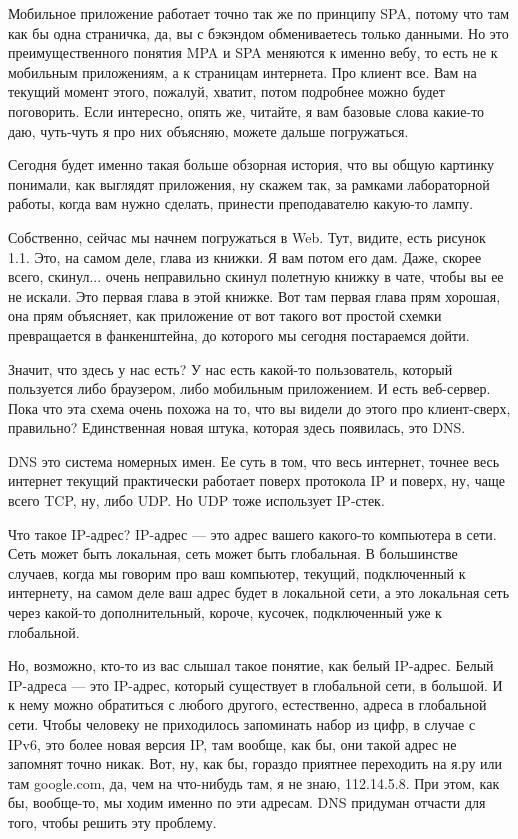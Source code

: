 \documentclass[12pt]{article} %
\begin{document}
Мобильное приложение работает точно так же по принципу SPA, потому что там как бы одна страничка, да, вы с бэкэндом обмениваетесь только данными.  Но это преимущественного понятия MPA и SPA меняются к именно вебу, то есть не к мобильным приложениям, а к страницам интернета.  Про клиент все.  Вам на текущий момент этого, пожалуй, хватит, потом подробнее можно будет поговорить.  Если интересно, опять же, читайте, я вам базовые слова какие-то даю, чуть-чуть я про них объясняю, можете дальше погружаться.


Сегодня будет именно такая больше обзорная история, что вы общую картинку понимали, как выглядят приложения, ну скажем так, за рамками лабораторной работы, когда вам нужно сделать, принести преподавателю какую-то лампу. 

Собственно, сейчас мы начнем погружаться в Web. Тут, видите, есть рисунок 1.1.  Это, на самом деле, глава из книжки. Я вам потом его дам. Даже, скорее всего, скинул...  очень неправильно скинул полетную книжку в чате, чтобы вы ее не искали.  Это первая глава в этой книжке.  Вот там первая глава прям хорошая, она прям объясняет, как приложение от вот такого вот простой схемки превращается в фанкенштейна, до которого мы сегодня постараемся дойти.  

Значит, что здесь у нас есть?  У нас есть какой-то пользователь, который пользуется либо браузером, либо мобильным приложением.  И есть веб-сервер.  Пока что эта схема очень похожа на то, что вы видели до этого про клиент-сверх, правильно?  Единственная новая штука, которая здесь появилась, это DNS.  

DNS это система номерных имен.  Ее суть в том, что весь интернет, точнее весь интернет текущий практически работает поверх протокола IP и поверх, ну, чаще всего TCP, ну, либо UDP.  Но UDP тоже использует IP-стек.  

Что такое IP-адрес?  IP-адрес — это адрес вашего какого-то компьютера в сети.  Сеть может быть локальная, сеть может быть глобальная.  В большинстве случаев, когда мы говорим про ваш компьютер, текущий, подключенный к интернету, на самом деле ваш адрес будет в локальной сети, а это локальная сеть через какой-то дополнительный, короче, кусочек, подключенный уже к глобальной.  

Но, возможно, кто-то из вас слышал такое понятие, как белый IP-адрес.  Белый IP-адреса — это IP-адрес, который существует в глобальной сети, в большой.  И к нему можно обратиться с любого другого, естественно, адреса в глобальной сети.  Чтобы человеку не приходилось запоминать набор из цифр, в случае с IPv6, это более новая версия IP, там вообще, как бы, они такой адрес не запомнят точно никак.  Вот, ну, как бы, гораздо приятнее переходить на я.ру или там google.com, да, чем на что-нибудь там, я не знаю, 112.14.5.8.  При этом, как бы, вообще-то, мы ходим именно по эти адресам.  DNS придуман отчасти для того, чтобы решить эту проблему.
\end{document}
